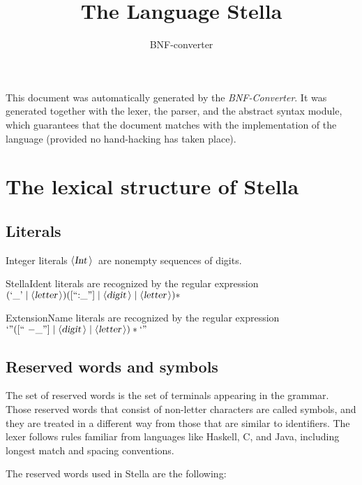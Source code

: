 \documentclass[a4paper,11pt]{article}
\title{The Language Stella}
\author{BNF-converter}
\begin{document}
\maketitle


\newcommand{\emptyP}{\mbox{$\epsilon$}}
\newcommand{\terminal}[1]{\mbox{{\texttt {#1}}}}
\newcommand{\nonterminal}[1]{\mbox{$\langle \mbox{{\sl #1 }} \! \rangle$}}
\newcommand{\arrow}{\mbox{::=}}
\newcommand{\delimit}{\mbox{$|$}}
\newcommand{\reserved}[1]{\mbox{{\texttt {#1}}}}
\newcommand{\literal}[1]{\mbox{{\texttt {#1}}}}
\newcommand{\symb}[1]{\mbox{{\texttt {#1}}}}

This document was automatically generated by the {\em BNF-Converter}.
It was generated together with the lexer, the parser, and the
abstract syntax module, which guarantees that the document
matches with the implementation of the language
(provided no hand-hacking has taken place).

\section*{The lexical structure of Stella}

\subsection*{Literals}
Integer literals \nonterminal{Int}\ are nonempty sequences of digits.



StellaIdent literals are recognized by the regular expression
\((\mbox{`\_'} \mid {\nonterminal{letter}}) ([\mbox{``:\_''}] \mid {\nonterminal{digit}} \mid {\nonterminal{letter}})*\)

ExtensionName literals are recognized by the regular expression
\(\mbox{`''} ([\mbox{`` {$-$}\_''}] \mid {\nonterminal{digit}} \mid {\nonterminal{letter}})* \mbox{`''}\)

\subsection*{Reserved words and symbols}
The set of reserved words is the set of terminals appearing in the grammar. Those reserved words that consist of non-letter characters are called symbols, and they are treated in a different way from those that are similar to identifiers. The lexer follows rules familiar from languages like Haskell, C, and Java, including longest match and spacing conventions.

The reserved words used in Stella are the following: \\
\end{document}
